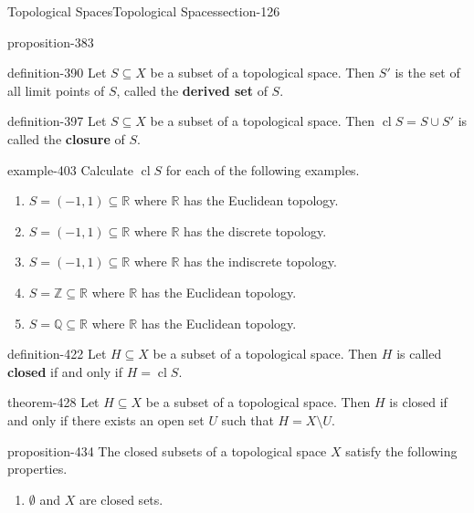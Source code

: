 \documentclass[oneside,10pt,]{article}
\newcommand{\terminology}[1]{\textbf{#1}}
\newcommand{\mb}{\mathbb}
\newcommand{\cl}{\operatorname{cl}}
\begin{document}
\begin{sectionptx}{Topological Spaces}{}{Topological Spaces}{}{}{section-126}
\begin{proposition}{}{}{proposition-383}
\end{proposition}
\begin{definition}{}{definition-390}%
\hypertarget{p-391}{}%
Let \(S\subseteq X\) be a subset of a topological space. Then \(S'\) is the set of all limit points of \(S\), called the \terminology{derived set} of \(S\).%
\end{definition}
\begin{definition}{}{definition-397}%
\hypertarget{p-398}{}%
Let \(S\subseteq X\) be a subset of a topological space. Then \(\cl S=S\cup S'\) is called the \terminology{closure} of \(S\).%
\end{definition}
\begin{example}{}{example-403}%
\hypertarget{p-404}{}%
Calculate \(\cl S\) for each of the following examples.%
\leavevmode%
\begin{enumerate}
\item\hypertarget{li-407}{}\(S=(-1,1)\subseteq\mb R\) where \(\mb R\) has the Euclidean topology.%
\item\hypertarget{li-410}{}\(S=(-1,1)\subseteq\mb R\) where \(\mb R\) has the discrete topology.%
\item\hypertarget{li-413}{}\(S=(-1,1)\subseteq\mb R\) where \(\mb R\) has the indiscrete topology.%
\item\hypertarget{li-416}{}\(S=\mb Z\subseteq\mb R\) where \(\mb R\) has the Euclidean topology.%
\item\hypertarget{li-419}{}\(S=\mb Q\subseteq\mb R\) where \(\mb R\) has the Euclidean topology.%
\end{enumerate}
\end{example}
\begin{definition}{}{definition-422}%
\hypertarget{p-423}{}%
Let \(H\subseteq X\) be a subset of a topological space. Then \(H\) is called \terminology{closed} if and only if \(H=\cl S\).%
\end{definition}
\begin{theorem}{}{}{theorem-428}%
\hypertarget{p-429}{}%
Let \(H\subseteq X\) be a subset of a topological space. Then \(H\) is closed if and only if there exists an open set \(U\) such that \(H=X\setminus U\).%
\end{theorem}
\begin{proposition}{}{}{proposition-434}%
\hypertarget{p-435}{}%
The closed subsets of a topological space \(X\) satisfy the following properties.%
\leavevmode%
\begin{enumerate}
\item\hypertarget{li-438}{}\(\emptyset\) and \(X\) are closed sets.%

\end{enumerate}
\end{proposition}
\end{sectionptx}
\end{document}
